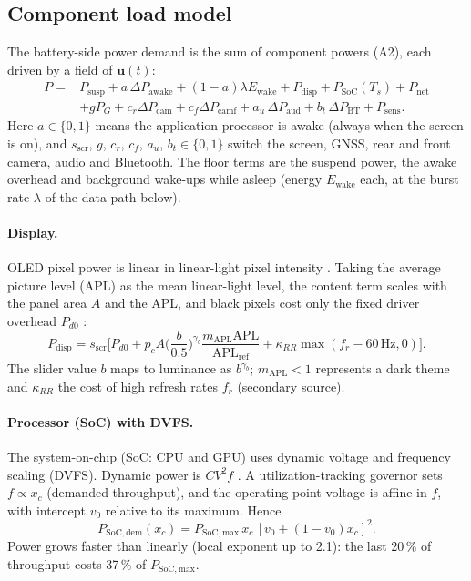 \subsection{Component load model}\label{sec:load}
The battery-side power demand is the sum of component powers (A2), each driven by a field of $\bm u(t)$:
\begin{equation}
\begin{aligned}
  P={}&P_{\mathrm{susp}}+a\,\Delta P_{\mathrm{awake}}+(1-a)\lambda E_{\mathrm{wake}}+P_{\mathrm{disp}}+P_{\mathrm{SoC}}(T_s)
  +P_{\mathrm{net}}\\
  &+g P_G+c_r\Delta P_{\mathrm{cam}}+c_f\Delta P_{\mathrm{camf}}+a_u\,\Delta P_{\mathrm{aud}}
  +b_t\,\Delta P_{\mathrm{BT}}+P_{\mathrm{sens}}.
\end{aligned}\label{eq:load}
\end{equation}
Here $a\in\{0,1\}$ means the application processor is awake (always when the screen is on), and
$s_{\mathrm{scr}}$, $g$, $c_r$, $c_f$, $a_u$, $b_t\in\{0,1\}$ switch the screen, GNSS, rear and front camera, audio and Bluetooth.
The floor terms are the suspend power, the awake overhead and background wake-ups while asleep (energy
$E_{\mathrm{wake}}$ each, at the burst rate $\lambda$ of the data path below).

\paragraph{Display.} OLED pixel power is linear in linear-light pixel intensity \cite{DZ11}. Taking the average
picture level (APL) as the mean linear-light level, the content term scales with the panel area $A$ and the APL,
and black pixels cost only the fixed driver overhead $P_{d0}$ \cite{CH13}:
\begin{equation}
  P_{\mathrm{disp}}=s_{\mathrm{scr}}\Big[P_{d0}+p_cA\Big(\frac{b}{0.5}\Big)^{\gamma_b}\frac{m_{\mathrm{APL}}\mathrm{APL}}{\mathrm{APL_{ref}}}
  +\kappa_{RR}\max(f_r-60\,\mathrm{Hz},0)\Big]. \label{eq:display}
\end{equation}
The slider value $b$ maps to luminance as $b^{\gamma_b}$; $m_{\mathrm{APL}}<1$ represents a dark theme and
$\kappa_{RR}$ the cost of high refresh rates $f_r$ \cite{AT20} (secondary source).

\paragraph{Processor (SoC) with DVFS.} The system-on-chip (SoC: CPU and GPU) uses dynamic voltage and frequency
scaling (DVFS). Dynamic power is $CV^2f$ \cite{LX}. A utilization-tracking governor sets $f\propto x_c$ (demanded
throughput), and the operating-point voltage is affine in $f$, with intercept $v_0$ relative to its maximum. Hence
\begin{equation}
  P_{\mathrm{SoC,dem}}(x_c)=P_{\mathrm{SoC,max}}\,x_c\,[v_0+(1-v_0)x_c]^2. \label{eq:dvfs}
\end{equation}
Power grows faster than linearly (local exponent up to 2.1): the last 20\,\% of throughput costs 37\,\% of
$P_{\mathrm{SoC,max}}$.

